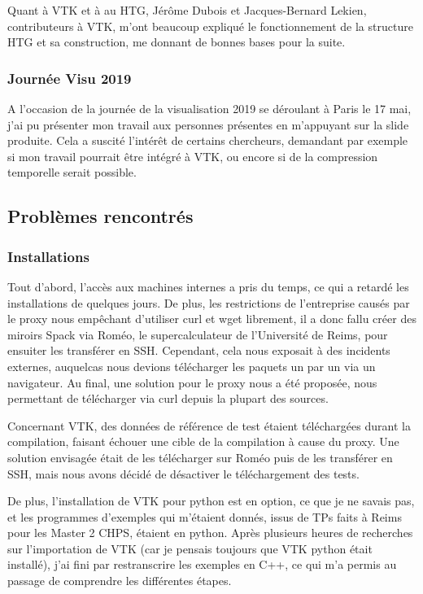 \documentclass[12pt,a4paper,twoside]{article}
\begin{document}
    Quant à VTK et à au HTG, Jérôme Dubois et Jacques-Bernard Lekien, contributeurs à VTK, m'ont beaucoup expliqué
    le fonctionnement de la structure HTG et sa construction, me donnant de bonnes bases pour la suite.

    \subsubsection{Journée Visu 2019}

    A l'occasion de la journée de la visualisation 2019 se déroulant à Paris le 17 mai, j'ai pu présenter mon travail
    aux personnes présentes en m'appuyant sur la slide produite. Cela a suscité l'intérêt de certains chercheurs,
    demandant par exemple si mon travail pourrait être intégré à VTK, ou encore si de la compression temporelle serait possible.




    \newpage
    \subsection{Problèmes rencontrés}

    \subsubsection{Installations}

    Tout d'abord, l'accès aux machines internes a pris du temps, ce qui a retardé les installations de quelques jours.
    De plus, les restrictions de l'entreprise causés par le proxy nous empêchant d'utiliser curl et wget librement, il a
    donc fallu créer des miroirs Spack via Roméo, le supercalculateur de l'Université de Reims, pour ensuiter les
    transférer en SSH. Cependant, cela nous exposait à des incidents externes, auquelcas nous devions télécharger les
    paquets un par un via un navigateur. Au final, une solution pour le proxy nous a été proposée, nous permettant de
    télécharger via curl depuis la plupart des sources.

    Concernant VTK, des données de référence de test étaient téléchargées durant la compilation, faisant échouer une cible de la compilation à cause du proxy.
    Une solution envisagée était de les télécharger sur Roméo puis de les transférer en SSH, mais nous avons décidé de désactiver le téléchargement
    des tests.

    De plus, l'installation de VTK pour python est en option, ce que je ne savais pas, et les programmes d'exemples qui m'étaient
    donnés, issus de TPs faits à Reims pour les Master 2 CHPS, étaient en python. Après plusieurs heures de recherches sur l'importation de VTK
    (car je pensais toujours que VTK python était installé),
    j'ai fini par restranscrire les exemples en C++, ce qui m'a permis au passage de comprendre les différentes étapes.
\end{document}
